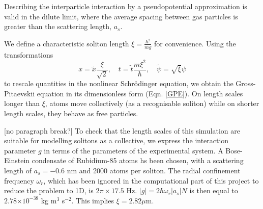 \documentclass[10pt, twocolumn]{revtex4}    %
\providecommand{\e}[1]{\ensuremath{\times 10^{#1}}} %
\begin{document}
Describing the interparticle interaction by a pseudopotential approximation is valid in the dilute limit, where the average spacing between gas particles is greater than the scattering length, $a_s$. 


We define a characteristic soliton length $\xi = \frac{\hbar^2}{mg}$ for convenience. Using the transformations 
\begin{equation} \label{transforms}
x = \tilde{x} \frac{\xi}{\sqrt{2}}, \quad		 t = \tilde{t} \frac{m \xi^2}{\hbar}, 	\quad \tilde{\psi} = \sqrt{\xi} \psi 
\end{equation}
to rescale quantities in the nonlinear Schr\"{o}dinger equation, we obtain the Gross-Pitaevskii equation in its dimensionless form (Eqn. \ref{GPE}). On length scales longer than $\xi$, atoms move collectively (as a recognisable soliton) while on shorter length scales, they behave as free particles. 

[no paragraph break?] To check that the length scales of this simulation are suitable for modelling solitons as a collective, we express the interaction parameter $g$ in terms of the parameters of the experimental system. A Bose-Einstein condensate of Rubidium-85 atoms hs been chosen, with a scattering length of $a_s = -0.6$ nm and 2000 atoms per soliton. The radial confinement frequency $\omega_r$, which has been ignored in the computational part of this project to reduce the problem to 1D, is $2\pi \times 17.5$ Hz. $|g| = 2\hbar \omega_r |a_s| N$ is then equal to $2.78 \e{-38}$ kg m$^3$ s$^{-2}$. This implies $\xi = 2.82 \mu$m.
\end{document}
